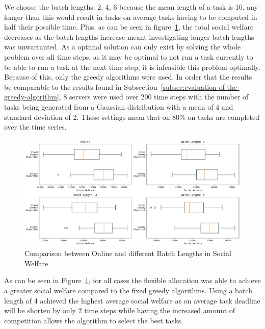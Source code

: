 We choose the batch lengths: 2, 4, 6 because the mean length of a task is 10, any longer than this would result in
tasks on average tasks having to be computed in half their possible time. Plus, as can be seen in
figure~\ref{fig:batch-task-allocation}, the total social welfare decreases as the batch lengths increase meant
investigating longer batch lengths was unwarranted. As a optimal solution can only exist by solving the whole problem
over all time steps, as it may be optimal to not run a task currently to be able to run a task at the next time step,
it is infeasible this problem optimally. Because of this, only the greedy algorithms were used. In order that the
results be comparable to the results found in Subsection~\ref{subsec:evaluation-of-the-greedy-algorithm}, 8 servers
were used over 200 time steps with the number of tasks being generated from a Gaussian distribution with a mean of 4
and standard deviation of 2. These settings mean that on 80\% on tasks are completed over the time series. 

\begin{figure}[h]
    \centering
    \includegraphics[width=\linewidth]{figs/online/online_batch_lengths.pdf}
    \caption{Comparison between Online and different Batch Lengths in Social Welfare}
    \label{fig:batch-task-allocation}
\end{figure}

As can be seen in Figure~\ref{fig:batch-task-allocation}, for all cases the flexible allocation was able 
to achieve a greater social welfare compared to the fixed greedy algorithms. Using a batch length of 
4 achieved the highest average social welfare as on average task deadline will be shorten by only 
2 time steps while having the increased amount of competition allows the algorithm to select the best 
tasks.  